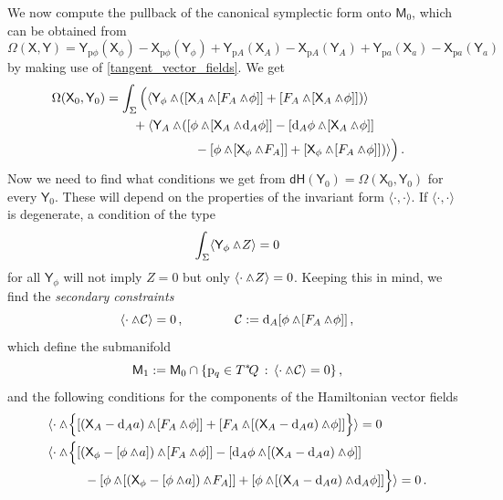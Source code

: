 \documentclass[12pt]{amsart}
\theoremstyle{plain}
\theoremstyle{definition}
\theoremstyle{remark}
\newcommand{\wed}{\wedge\hspace*{-7.5pt}.\hspace*{3pt}}
\numberwithin{equation}{section}  %
\begin{document}
We now compute the pullback of the canonical symplectic form onto $\mathsf{M}_0$, which can be obtained from
\[
\Omega(\mathsf{X},\mathsf{Y})=\mathsf{Y}_{\mathrm{p} \phi}(\mathsf{X}_\phi)-\mathsf{X}_{\mathrm{p} \phi}(\mathsf{Y}_\phi)+\mathsf{Y}_{\mathrm{p}A}(\mathsf{X}_A)-\mathsf{X}_{\mathrm{p} A}(\mathsf{Y}_A)+\mathsf{Y}_{\mathrm{p} a}(\mathsf{X}_{a})-\mathsf{X}_{\mathrm{p} a}(\mathsf{Y}_{a})
\]
by making use of \eqref{tangent_vector_fields}. We get
\begin{align*}
  \hspace*{-5mm}\Omega(\mathsf{X}_0,\mathsf{Y}_0)=\int_\Sigma\Big(&\langle \mathsf{Y}_\phi\wed ([\mathsf{X}_A\wed[F_A\wed \phi]]+[F_A\wed[\mathsf{X}_A\wed \phi]])\rangle\\
  &\hspace*{-4mm}+\langle \mathsf{Y}_A\wed([\phi\wed[\mathsf{X}_A\wed \mathrm{d}_A\phi]]-[\mathrm{d}_A\phi\wed[\mathsf{X}_A\wed \phi]]\\
  &\hspace*{1.3cm}-[\phi\wed[\mathsf{X}_\phi\wed F_A]]+[\mathsf{X}_\phi\wed[F_A\wed \phi]])\rangle\Big)\,.
\end{align*}
Now we need to find what conditions we get from $ \mathsf{dH}(\mathsf{Y}_0)=\Omega(\mathsf{X}_0,\mathsf{Y}_0)$ for every $\mathsf{Y}_0$. These will depend on the properties of the invariant form $\langle \cdot,\!\cdot\rangle$. If $\langle \cdot,\!\cdot\rangle$ is degenerate, a condition of the type
\[
\int_\Sigma \langle \mathsf{Y}_\phi\wed Z\rangle=0
\]
for all $\mathsf{Y}_\phi$ will not imply $Z=0$ but only $\langle \cdot \wed Z\rangle=0$. Keeping this in mind, we find the \textit{secondary constraints}
\begin{equation}\label{constraint}
\langle\cdot\wed \mathcal{C}\rangle=0\,,\qquad\qquad \mathcal{C}:=\mathrm{d}_A[\phi\wed[F_A\wed\phi]]\,,
\end{equation}
which define the submanifold 
\begin{equation}
  \mathsf{M}_1:=\mathsf{M}_0\cap \{\mathrm{p}_q\in T^*\!Q\,:\, \langle\cdot\wed \mathcal{C}\rangle=0\}\,,  \label{M1}
\end{equation}
and the following conditions for the components of the Hamiltonian vector fields
\begin{subequations}\label{eqs:X}
\begin{align}
  & \langle\cdot\wed \Big\{[(\mathsf{X}_A-\mathrm{d}_Aa)\wed[F_A\wed\phi]]+[F_A\wed[(\mathsf{X}_A-\mathrm{d}_Aa)\wed\phi]]\Big\}\rangle=0 \label{eq1}\\
  & \langle\cdot\wed \Big\{[(\mathsf{X}_\phi-[\phi\wed a])\wed [F_A\wed\phi]]-[\mathrm{d}_A\phi\wed[(\mathsf{X}_A-\mathrm{d}_Aa)\wed\phi ]]\label{eq2}\\
  &\hspace*{1cm} -[\phi\wed[(\mathsf{X}_\phi-[\phi\wed a])\wed F_A]] +[\phi\wed[(\mathsf{X}_A-\mathrm{d}_Aa)\wed \mathrm{d}_A\phi]]\Big\}\rangle=0\,.\nonumber
\end{align}
\end{subequations}
\end{document}
